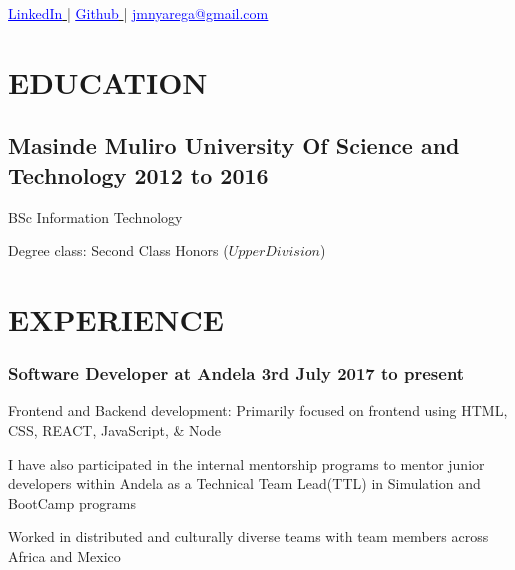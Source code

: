 \documentclass{article}
\author{Josiah Mokobo Nyarega}
\begin{document}
\renewcommand{\maketitle}{
  \begin{center}
    {
      \huge\bfseries
      \theauthor
    }

    \href{https://www.linkedin.com/in/josiah-nyarega-84820a103}{
      \textcolor{blue}{
        \underline{LinkedIn}
      }
    } |
    \href{https://www.github.com/jmnyarega}{
      \textcolor{blue}{
      \underline{Github}
      }
    } |
    \href{jmnyarega@gmail.com}{
      \textcolor{blue}{
        \underline{jmnyarega@gmail.com}
      }
    }
\end{center}
}
\maketitle

\section{EDUCATION}
\subsection{Masinde Muliro University Of Science and Technology\hspace{130pt} \textbf{2012 to 2016}}
\begin{description}[font=$\bullet$~\normalfont\scshape\color{red!50!black}]
  \item{BSc Information Technology}
  \item{Degree class: Second Class Honors (\(Upper Division\))}
\end{description}
\section{EXPERIENCE}
\subsubsection{Software Developer at Andela\hspace{190pt} \textbf{3rd July 2017 to present}}
\begin{description}[font=$\bullet$~\normalfont\scshape\color{red!50!black}]
  \item{Frontend and Backend development: Primarily focused on frontend using HTML, CSS, REACT, JavaScript, \& Node}
  \item{I have also participated in the internal mentorship programs to mentor junior developers within Andela as a Technical Team Lead(TTL) in Simulation and BootCamp programs}
  \item{Worked in distributed and culturally diverse teams with team members across Africa and Mexico}
\end{description}
\end{document}
